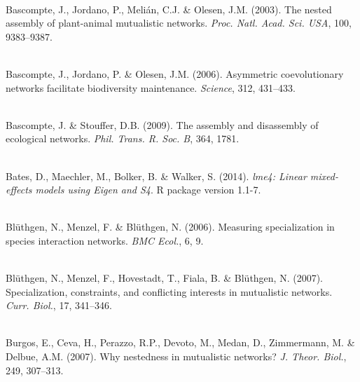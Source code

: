 \documentclass[12pt]{article}
\begin{document}
\begin{thebibliography}{67}
\hspace{0em}\\Bascompte, J., Jordano, P., Meli\'an, C.J. \& Olesen, J.M.
  (2003).
\newblock The nested assembly of plant-animal mutualistic networks.
\newblock \emph{Proc. Natl. Acad. Sci. USA}, 100, 9383--9387.

\hspace{0em}\\Bascompte, J., Jordano, P. \& Olesen, J.M. (2006).
\newblock Asymmetric coevolutionary networks facilitate biodiversity
  maintenance.
\newblock \emph{Science}, 312, 431--433.

\hspace{0em}\\Bascompte, J. \& Stouffer, D.B. (2009).
\newblock The assembly and disassembly of ecological networks.
\newblock \emph{Phil. Trans. R. Soc. B}, 364, 1781.

\hspace{0em}\\Bates, D., Maechler, M., Bolker, B. \& Walker, S. (2014).
\newblock \emph{lme4: Linear mixed-effects models using Eigen and S4}.
\newblock R package version 1.1-7.

\hspace{0em}\\Bl{\"u}thgen, N., Menzel, F. \& Bl{\"u}thgen, N. (2006).
\newblock Measuring specialization in species interaction networks.
\newblock \emph{BMC Ecol.}, 6, 9.

\hspace{0em}\\Bl{\"u}thgen, N., Menzel, F., Hovestadt, T., Fiala, B. \&
  Bl{\"u}thgen, N. (2007).
\newblock Specialization, constraints, and conflicting interests in mutualistic
  networks.
\newblock \emph{Curr. Biol.}, 17, 341--346.

\hspace{0em}\\Burgos, E., Ceva, H., Perazzo, R.P., Devoto, M., Medan, D.,
  Zimmermann, M. \& Delbue, A.M. (2007).
\newblock Why nestedness in mutualistic networks?
\newblock \emph{J. Theor. Biol.}, 249, 307--313.


\end{thebibliography}
\end{document}
